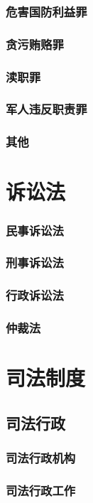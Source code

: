 \documentclass[UTF8]{../ApplicationUniverse}
\begin{document}
        \subsubsection{危害国防利益罪}
        \subsubsection{贪污贿赂罪}
        \subsubsection{渎职罪}
        \subsubsection{军人违反职责罪}
        \subsubsection{其他}

        
\section{诉讼法}
        \subsubsection{民事诉讼法}
        \subsubsection{刑事诉讼法}
        \subsubsection{行政诉讼法}
        \subsubsection{仲裁法}

\section{司法制度}
    \subsection{司法行政}
        \subsubsection{司法行政机构}
        \subsubsection{司法行政工作}
\end{document}
